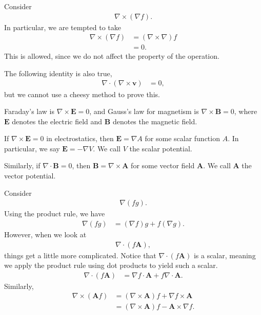 \documentclass[10pt]{mypackage}
\begin{document}
\begin{example}
  Consider
  \begin{align*}
    \nabla \times \left(\nabla f\right).
  \end{align*}
  In particular, we are tempted to take
  \begin{align*}
    \nabla \times \left(\nabla f\right) &= \left(\nabla \times \nabla\right)f\\
                                        &= 0.
  \end{align*}
  This is allowed, since we do not affect the property of the operation.\newline

  The following identity is also true,
  \begin{align*}
    \nabla \cdot \left(\nabla \times \mathbf{v}\right) &= 0,
  \end{align*}
  but we cannot use a cheesy method to prove this.
\end{example}
\begin{remark}
  Faraday's law is $\nabla \times \mathbf{E} = 0$, and Gauss's law for magnetism is $\nabla \times \mathbf{B} = 0$, where $\mathbf{E}$ denotes the electric field and $\mathbf{B}$ denotes the magnetic field.\newline

  If $\nabla \times \mathbf{E} = 0$ in electrostatics, then $\mathbf{E} = \nabla A$ for some scalar function $A$. In particular, we say $\mathbf{E} = -\nabla V$. We call $V$ the scalar potential.\newline

  Similarly, if $\nabla \cdot \mathbf{B} = 0$, then $\mathbf{B} = \nabla \times \mathbf{A}$ for some vector field $\mathbf{A}$. We call $\mathbf{A}$ the vector potential.
\end{remark}
\begin{example}[Products]
  Consider
  \begin{align*}
    \nabla \left(fg\right).
  \end{align*}
  Using the product rule, we have
  \begin{align*}
    \nabla \left(fg\right) &= \left(\nabla f\right)g + f\left(\nabla g\right).
  \end{align*}
  However, when we look at
  \begin{align*}
    \nabla \cdot \left(f\mathbf{A}\right),
  \end{align*}
  things get a little more complicated. Notice that $\nabla \cdot \left(f\mathbf{A}\right)$ is a scalar, meaning we apply the product rule using dot products to yield such a scalar.
  \begin{align*}
    \nabla \cdot \left(f\mathbf{A}\right) &= \nabla f \cdot \mathbf{A}  + f\nabla\cdot \mathbf{A}.
  \end{align*}
  Similarly,
  \begin{align*}
    \nabla \times \left(\mathbf{A}f\right) &= \left(\nabla \times \mathbf{A}\right)f + \nabla f \times \mathbf{A}\\
                                           &= \left(\nabla \times \mathbf{A}\right)f - \mathbf{A}\times \nabla f.
  \end{align*}
\end{example}
\end{document}
